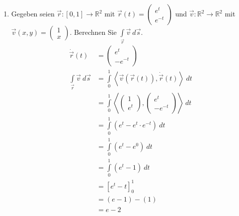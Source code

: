 \documentclass[12pt]{article}
\begin{document}
\begin{enumerate}[start=1,label={\bfseries Frage \arabic*:},leftmargin=1in]
    \item Gegeben seien $\Vec{r}:[0,1] \to \mathbb{R}^2$ mit $\Vec{r}(t) = \begin{pmatrix} e^t \\ e^{-t} \end{pmatrix}$ und $\Vec{v}:\mathbb{R}^2 \to \mathbb{R}^2$ mit $\Vec{v}(x,y)= \begin{pmatrix} 1 \\ x \end{pmatrix}$. Berechnen Sie $\int\limits_{\Vec{r}} \Vec{v} \: d\Vec{s}$.
    \begin{align*}
        \Dot{\Vec{r}}(t) &= \begin{pmatrix} e^t \\ -e^{-t} \end{pmatrix} \\
        \int\limits_{\Vec{r}} \Vec{v} \: d\Vec{s} &= \int\limits_0^1 \left< \Vec{v}(\Vec{r}(t)) , \Dot{\Vec{r}}(t) \right> \: dt \\
        &= \int\limits_0^1 \left< \begin{pmatrix} 1 \\ e^t \end{pmatrix} , \begin{pmatrix} e^t \\ -e^{-t} \end{pmatrix} \right> \: dt \\
        &= \int\limits_0^1 (e^t - e^t \cdot e^{-t}) \: dt \\
        &= \int\limits_0^1 (e^t - e^0) \: dt \\
        &= \int\limits_0^1 (e^t - 1) \: dt \\
        &= [e^t - t]_0^1 \\
        &= (e - 1) - (1) \\
        &= e - 2
    \end{align*}

\end{enumerate}
\end{document}
